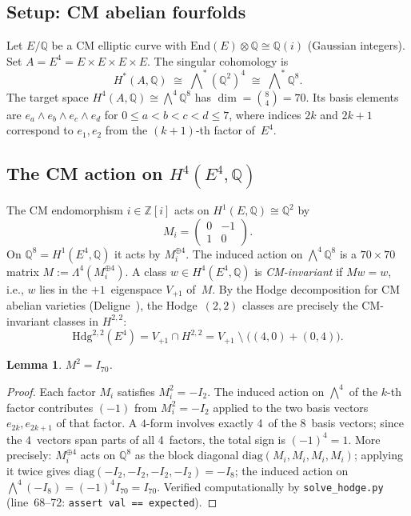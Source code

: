 \documentclass[11pt]{article}
\theoremstyle{plain}
\newtheorem{lemma}[theorem]{Lemma}
\theoremstyle{definition}
\theoremstyle{remark}
\newcommand{\Z}{\mathbb{Z}}
\newcommand{\Q}{\mathbb{Q}}
\newcommand{\End}{\mathrm{End}}
\newcommand{\Hdg}{\mathrm{Hdg}}
\begin{document}
\subsection{Setup: CM abelian fourfolds}\label{sec:setup}

Let $E/\Q$ be a CM elliptic curve with $\End(E) \otimes \Q \cong
\Q(i)$ (Gaussian integers).  Set $A = E^4 = E \times E \times E
\times E$.  The singular cohomology is
\[
  H^*(A, \Q) \;\cong\; \bigwedge\nolimits^* (\Q^2)^4
  \;\cong\; \bigwedge\nolimits^* \Q^8.
\]
The target space $H^4(A, \Q) \cong \bigwedge^4 \Q^8$ has
$\dim = \binom{8}{4} = 70$.  Its basis elements are
$e_a \wedge e_b \wedge e_c \wedge e_d$ for
$0 \leq a < b < c < d \leq 7$, where indices $2k$ and $2k{+}1$
correspond to $e_1, e_2$ from the $(k{+}1)$-th factor of~$E^4$.

\subsection{The CM action on $H^4(E^4,\Q)$}\label{sec:cmaction}

The CM endomorphism $i \in \Z[i]$ acts on $H^1(E, \Q) \cong \Q^2$ by
\begin{equation}\label{eq:cm-matrix}
M_i = \begin{pmatrix} 0 & -1 \\ 1 & 0 \end{pmatrix}.
\end{equation}
On $\Q^8 = H^1(E^4, \Q)$ it acts by $M_i^{\oplus 4}$.
The induced action on $\bigwedge^4 \Q^8$ is a $70 \times 70$
matrix $M := \Lambda^4(M_i^{\oplus 4})$.  A class
$w \in H^4(E^4, \Q)$ is \emph{CM-invariant} if $Mw = w$,
i.e., $w$ lies in the $+1$~eigenspace $V_{+1}$ of~$M$.
By the Hodge decomposition for CM abelian varieties
(Deligne~\cite{Deligne1982}), the Hodge~$(2,2)$ classes
are precisely the CM-invariant classes in $H^{2,2}$:
\[
  \Hdg^{2,2}(E^4) = V_{+1} \cap H^{2,2}
  = V_{+1} \;\setminus\; \bigl((4,0)+(0,4)\bigr).
\]

\begin{lemma}\label{lem:involution}
$M^2 = I_{70}$.
\end{lemma}

\begin{proof}
Each factor $M_i$ satisfies $M_i^2 = -I_2$.  The induced action
on $\bigwedge^4$ of the $k$-th factor contributes $(-1)$ from
$M_i^2 = -I_2$ applied to the two basis vectors
$e_{2k}, e_{2k+1}$ of that factor.  A $4$-form involves exactly
4~of the 8~basis vectors; since the $4$~vectors span parts of all
4~factors, the total sign is $(-1)^4 = 1$.  More precisely:
$M_i^{\oplus 4}$ acts on $\Q^8$ as the block diagonal
$\mathrm{diag}(M_i, M_i, M_i, M_i)$; applying it twice gives
$\mathrm{diag}(-I_2, -I_2, -I_2, -I_2) = -I_8$; the induced
action on $\bigwedge^4(-I_8) = (-1)^4 I_{70} = I_{70}$.
Verified computationally by \texttt{solve\_hodge.py}
(line~68--72: \texttt{assert val == expected}).
\end{proof}
\end{document}

